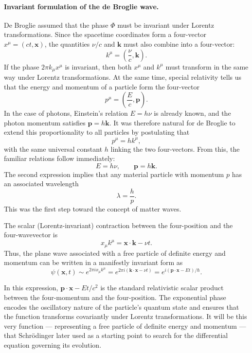 \paragraph{Invariant formulation of the de Broglie wave.}
De Broglie assumed that the phase $\Phi$ must be invariant under Lorentz transformations. Since the spacetime coordinates form a four-vector $x^\mu = (ct, \mathbf{x})$, the quantities $\nu/c$ and $\mathbf{k}$ must also combine into a four-vector:
\[
    k^\mu = \left(\frac{\nu}{c}, \mathbf{k}\right).
\]
If the phase $2\pi k_\mu x^\mu$ is invariant, then both $x^\mu$ and $k^\mu$ must transform in the same way under Lorentz transformations.
At the same time, special relativity tells us that the energy and momentum of a particle form the four-vector
\[
    p^\mu = \left(\frac{E}{c}, \mathbf{p}\right).
\]
In the case of photons, Einstein’s relation $E = h\nu$ is already known, and the photon momentum satisfies $\mathbf{p} = h\mathbf{k}$.
It was therefore natural for de Broglie to extend this proportionality to all particles by postulating that
\[
    p^\mu = h k^\mu,
\]
with the same universal constant $h$ linking the two four-vectors.
From this, the familiar relations follow immediately:
\[
    E = h\nu, \qquad \mathbf{p} = h\mathbf{k}.
\]
The second expression implies that any material particle with momentum $p$ has an associated wavelength
\[
    \lambda = \frac{h}{p}.
\]
This was the first step toward the concept of matter waves.

The scalar (Lorentz-invariant) contraction between the four-position and the four-wavevector is
\[
    x_\mu k^\mu = \mathbf{x}\cdot\mathbf{k} - \nu t.
\]
Thus, the plane wave associated with a free particle of definite energy and momentum can be written in a manifestly invariant form as
\begin{equation}
    \psi(\mathbf{x},t) \sim e^{2\pi i x_\mu k^\mu}
    = e^{2\pi i(\mathbf{k}\cdot\mathbf{x} - \nu t)}
    = e^{i(\mathbf{p} \cdot \mathbf{x} - Et)/\hbar}.
    \label{eq:debroglie_wave_function}
\end{equation}

In this expression, $\mathbf{p}\cdot\mathbf{x} - Et/c^2$ is the standard relativistic scalar product between the four-momentum and the four-position.
The exponential phase encodes the oscillatory nature of the particle’s quantum state and ensures that the function transforms covariantly under Lorentz transformations.
It will be this very function --- representing a free particle of definite energy and momentum --- that Schrödinger later used as a starting point to search for the differential equation governing its evolution.

